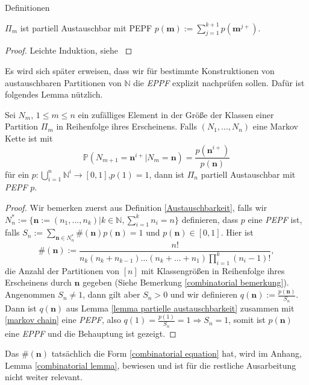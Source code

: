 \begin{section}{Definitionen}
\begin{lemma}
\begin{center} 
    $\Pi_m$ ist partiell Austauschbar mit PEPF $p(\textbf{m}):=  \sum_{j=1}^{k+1} p(\textbf{m}^{j+})$.
\end{center}
\end{lemma}
\begin{proof}
    Leichte Induktion, siehe \cite[Proposition 10]{pitman1995exchangeable}
\end{proof}
\begin{Bemerkung}
    Es wird sich später erweisen, dass wir für bestimmte Konstruktionen von austauschbaren Partitionen von $\mathbb{N}$ die \textit{EPPF} explizit nachprüfen sollen. Dafür ist folgendes Lemma nützlich.
\end{Bemerkung}
\begin{lemma}
    \label{Austauschbar Lemma}
    Sei $N_m$, $1 \leq m \leq n$ ein zufälliges Element in der Größe der Klassen einer Partition $\Pi_m$ in Reihenfolge ihres Erscheinens. Falls $(N_1,...,N_n)$ eine Markov Kette ist mit 
    \begin{equation}
    \label{markov chain}
    \mathbb{P}(N_{m+1} = \textbf{n}^{i+} | N_{m} = \textbf{n}) = \frac{p(\textbf{n}^{i+})}{p(\textbf{n})} 
    \end{equation}
   für ein $p: \bigcup_{i = 1}^{n}\mathbb{N}^i \rightarrow [0,1]$,$p(1) = 1$, dann ist $\Pi_n$ partiell Austauschbar mit \textit{PEPF} $p$.
\end{lemma}
\begin{proof}
    Wir bemerken zuerst aus Definition \ref{Austauschbarkeit}, falls wir $N^*_n:= \{\textbf{n}:= (n_1,...,n_k)|k \in \mathbb{N},\sum_{i=1}^{k}n_i = n\}$ definieren, dass $p$ eine \textit{PEPF} ist, falls $S_n := \sum_{\textbf{n} \in N^*_n}\#(\textbf{n})p(\textbf{n}) = 1$ und $p(\textbf{n}) \in [0,1]$. Hier ist 
    \begin{equation}
        \label{combinatorial equation}
        \#(\textbf{n}):= \frac{n!}{n_k(n_k + n_{k-1})...(n_k+...+n_1)\prod_{i=1}^{k}(n_i-1)!},
    \end{equation}
    die Anzahl der Partitionen von $[n]$ mit Klassengrößen in Reihenfolge ihres Erscheinens durch $\textbf{n}$ gegeben (Siehe Bemerkung \ref{combinatorial bemerkung}). Angenommen $S_n \neq 1$, dann gilt aber $S_n> 0$ und wir definieren $q(\textbf{n}) := \frac{p(\textbf{n})}{S_n}$. Dann ist $q(\textbf{n})$ aus Lemma \ref{lemma partielle austauschbarkeit} zusammen mit \ref{markov chain} eine \textit{PEPF}, also $q(1) = \frac{p(1)}{S_n} = 1 \Rightarrow S_n =1$, somit ist $p(\textbf{n})$ eine \textit{EPPF} und die Behauptung ist gezeigt. 
\end{proof}
\begin{Bemerkung}
    \label{combinatorial bemerkung}
    Das $\#(\textbf{n})$ tatsächlich die Form \ref{combinatorial equation} hat, wird im Anhang, Lemma \ref{combinatorial lemma}, bewiesen und ist für die restliche Ausarbeitung nicht weiter relevant.
\end{Bemerkung}
\end{section}